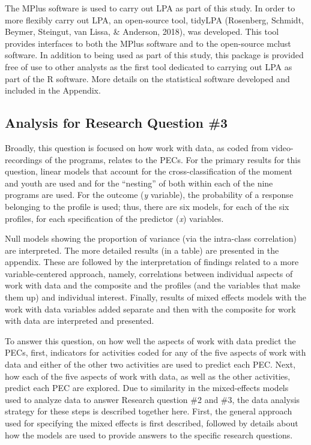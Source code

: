 \documentclass[]{book}
\theoremstyle{definition}
\theoremstyle{definition}
\theoremstyle{definition}
\theoremstyle{remark}
\begin{document}
The MPlus software is used to carry out LPA as part of this study. In
order to more flexibly carry out LPA, an open-source tool, tidyLPA
(Rosenberg, Schmidt, Beymer, Steingut, van Lissa, \& Anderson, 2018),
was developed. This tool provides interfaces to both the MPlus software
and to the open-source mclust software. In addition to being used as
part of this study, this package is provided free of use to other
analysts as the first tool dedicated to carrying out LPA as part of the
R software. More details on the statistical software developed and
included in the Appendix.

\subsection{Analysis for Research Question
\#3}\label{analysis-for-research-question-3}

Broadly, this question is focused on how work with data, as coded from
video-recordings of the programs, relates to the PECs. For the primary
results for this question, linear models that account for the
cross-classification of the moment and youth are used and for the
``nesting'' of both within each of the nine programs are used. For the
outcome (\emph{y} variable), the probability of a response belonging to
the profile is used; thus, there are six models, for each of the six
profiles, for each specification of the predictor (\emph{x}) variables.

Null models showing the proportion of variance (via the intra-class
correlation) are interpreted. The more detailed results (in a table) are
presented in the appendix. These are followed by the interpretation of
findings related to a more variable-centered approach, namely,
correlations between individual aspects of work with data and the
composite and the profiles (and the variables that make them up) and
individual interest. Finally, results of mixed effects models with the
work with data variables added separate and then with the composite for
work with data are interpreted and presented.

To answer this question, on how well the aspects of work with data
predict the PECs, first, indicators for activities coded for any of the
five aspects of work with data and either of the other two activities
are used to predict each PEC. Next, how each of the five aspects of work
with data, as well as the other activities, predict each PEC are
explored. Due to similarity in the mixed-effects models used to analyze
data to answer Research question \#2 and \#3, the data analysis strategy
for these steps is described together here. First, the general approach
used for specifying the mixed effects is first described, followed by
details about how the models are used to provide answers to the specific
research questions.
\end{document}
